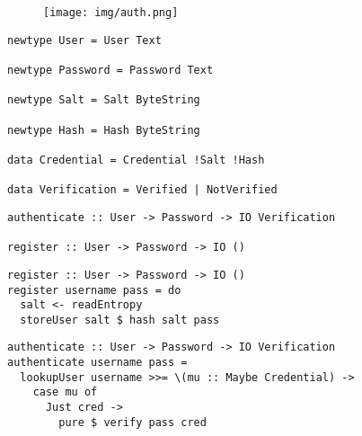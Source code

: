 \documentclass{beamer}
\begin{document}
\begin{frame}

\begin{figure}
  \texttt{[image: img/auth.png]}
\end{figure}
\end{frame}


\begin{frame}[fragile]

\begin{verbatim}
newtype User = User Text

newtype Password = Password Text

newtype Salt = Salt ByteString

newtype Hash = Hash ByteString

data Credential = Credential !Salt !Hash

data Verification = Verified | NotVerified
\end{verbatim}

\end{frame}


\begin{frame}[fragile]

\begin{verbatim}
authenticate :: User -> Password -> IO Verification

register :: User -> Password -> IO ()
\end{verbatim}

\end{frame}

\begin{frame}[fragile]

\begin{verbatim}
register :: User -> Password -> IO ()
register username pass = do
  salt <- readEntropy
  storeUser salt $ hash salt pass
\end{verbatim}

\end{frame}

\begin{frame}[fragile]

\begin{verbatim}
authenticate :: User -> Password -> IO Verification
authenticate username pass =
  lookupUser username >>= \(mu :: Maybe Credential) ->
    case mu of
      Just cred ->
        pure $ verify pass cred
\end{verbatim}

\end{frame}
\end{document}
